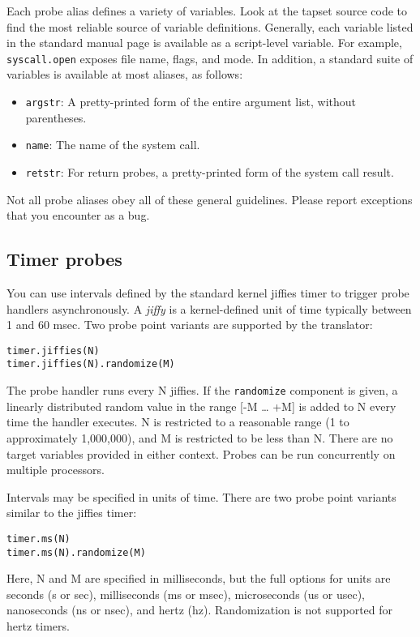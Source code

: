 \documentclass[twoside,english]{article}
\newenvironment{vindent}
{\begin{list}{}{\setlength{\listparindent}{6pt}}
\item[]}
{\end{list}}
\begin{document}
Each probe alias defines a variety of variables. Look at the tapset
source code to find the most reliable source of variable definitions.
Generally, each variable listed in the standard manual page is
available as a script-level variable. For example,
\texttt{syscall.open} exposes file name, flags, and mode.  In addition,
a standard suite of variables is available at most aliases, as follows:

\begin{itemize}
\item \texttt{argstr}: A pretty-printed form of the entire argument
  list, without parentheses.
\item \texttt{name}: The name of the system call.
\item \texttt{retstr}: For return probes, a pretty-printed form of the
  system call result.
\end{itemize}

Not all probe aliases obey all of these general guidelines.  Please
report exceptions that you encounter as a bug.


\subsection{Timer probes}
You can use intervals defined by the standard kernel jiffies
timer to trigger probe handlers asynchronously. A \emph{jiffy} is a kernel-defined
unit of time typically between 1 and 60 msec. Two probe point variants are
supported by the translator:

\begin{vindent}
\begin{verbatim}
timer.jiffies(N)
timer.jiffies(N).randomize(M)
\end{verbatim}
\end{vindent}
The probe handler runs every N jiffies. If the \texttt{randomize}
component is given, a linearly distributed random value in the range {[}-M
\ldots{} +M] is added to N every time the handler executes. N is restricted
to a reasonable range (1 to approximately 1,000,000), and M is restricted
to be less than N. There are no target variables provided in either context.
Probes can be run concurrently on multiple processors.

Intervals may be specified in units of time. There are two probe point variants
similar to the jiffies timer:

\begin{vindent}
\begin{verbatim}
timer.ms(N)
timer.ms(N).randomize(M)
\end{verbatim}
\end{vindent}
Here, N and M are specified in milliseconds, but the
full options for units are seconds (s or sec), milliseconds (ms or msec),
microseconds (us or usec), nanoseconds (ns or nsec), and hertz (hz). Randomization
is not supported for hertz timers.
\end{document}

